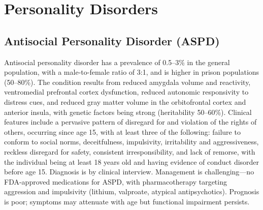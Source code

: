 \section{Personality Disorders}








\label{sec:Personality Disorders}

\subsection{Antisocial Personality Disorder (ASPD)}
\label{sec:Antisocial Personality Disorder (ASPD)}
Antisocial personality disorder has a prevalence of 0.5--3\% in the general population, with a male-to-female ratio of 3:1, and is higher in prison populations (50--80\%). The condition results from reduced amygdala volume and reactivity, ventromedial prefrontal cortex dysfunction, reduced autonomic responsivity to distress cues, and reduced gray matter volume in the orbitofrontal cortex and anterior insula, with genetic factors being strong (heritability 50--60\%). Clinical features include a pervasive pattern of disregard for and violation of the rights of others, occurring since age 15, with at least three of the following: failure to conform to social norms, deceitfulness, impulsivity, irritability and aggressiveness, reckless disregard for safety, consistent irresponsibility, and lack of remorse, with the individual being at least 18 years old and having evidence of conduct disorder before age 15. Diagnosis is by clinical interview. Management is challenging---no FDA-approved medications for ASPD, with pharmacotherapy targeting aggression and impulsivity (lithium, valproate, atypical antipsychotics). Prognosis is poor; symptoms may attenuate with age but functional impairment persists.

